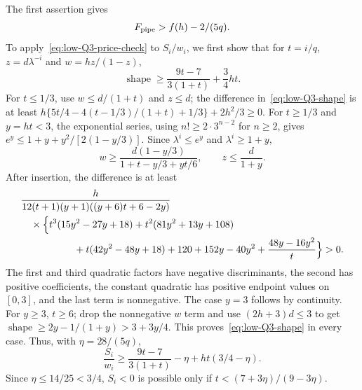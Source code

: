The first assertion gives
\begin{equation}\label{eq:low-Q3-source}
 F_{\rm pipe}>f(h)-2/(5q).
\end{equation}
To apply~\eqref{eq:low-Q3-price-check} to $S_i/w_i$, we first
show that for $t=i/q$, $z=d\lambda^{-i}$ and $w=hz/(1-z)$,
\begin{equation}\label{eq:low-Q3-shape}
 \operatorname{shape}\ge\frac{9t-7}{3(1+t)}+\frac34ht.
\end{equation}
For $t\le1/3$, use $w\le d/(1+t)$ and $z\le d$; the difference
in~\eqref{eq:low-Q3-shape} is at least
$h\{5t/4-4(t-1/3)/(1+t)+1/3\}+2h^2/3\ge0$.
For $t\ge1/3$ and $y=ht<3$, the exponential series, using
$n!\ge2\cdot3^{n-2}$ for $n\ge2$, gives
$e^y\le1+y+y^2/[2(1-y/3)]$.
Since $\lambda^i\le e^y$ and $\lambda^i\ge1+y$,
\[
 w\ge\frac{d(1-y/3)}{1+t-y/3+yt/6},\qquad z\le\frac d{1+y}.
\]
After insertion, the difference is at least
\[\begin{aligned}
 &\frac{h}{12(t+1)(y+1)((y+6)t+6-2y)}\\
 &\quad\times\Bigl\{t^3(15y^2-27y+18)+t^2(81y^2+13y+108)\\
 &\hspace{19mm}+t(42y^2-48y+18)+120+152y-40y^2
                  +\frac{48y-16y^2}{t}\Bigr\}>0.
\end{aligned}\]
The first and third quadratic factors have negative discriminants,
the second has positive coefficients, the constant quadratic has
positive endpoint values on $[0,3]$, and the last term is
nonnegative.  The case $y=3$ follows by continuity.
For $y\ge3$, $t\ge6$; drop the nonnegative $w$ term and use
$(2h+3)d\le3$ to get
$\operatorname{shape}\ge2y-1/(1+y)>3+3y/4$.
This proves~\eqref{eq:low-Q3-shape} in every case.  Thus, with
$\eta=28/(5q)$,
\begin{equation}\label{eq:low-Q3-head-envelope}
 \frac{S_i}{w_i}\ge\frac{9t-7}{3(1+t)}-\eta
                                  +ht(3/4-\eta).
\end{equation}
Since $\eta\le14/25<3/4$, $S_i<0$ is possible only if
$t<(7+3\eta)/(9-3\eta)$.

